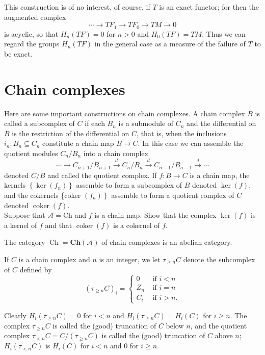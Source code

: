 This construction is of no interest, of course, if $T$ is an exact functor; for then the augmented complex
$$
\cdots \rightarrow T F_1 \rightarrow T F_0 \rightarrow T M \rightarrow 0
$$
is acyclic, so that $H_n(T F)=0$ for $n>0$ and $H_0(T F)=T M$. Thus we can regard the groups $H_n(T F)$ in the general case as a measure of the failure of $T$ to be exact.

\section{Chain complexes}

Here are some important constructions on chain complexes. A chain complex $B$ is called a subcomplex of $C$ if each $B_n$ is a submodule of $C_n$ and the differential on $B$ is the restriction of the differential on $C$, that is, when the inclusions $i_n: B_n \subseteq C_n$ constitute a chain map $B \rightarrow C$. In this case we can assemble the quotient modules $C_n / B_n$ into a chain complex
$$
\cdots \rightarrow C_{n+1} / B_{n+1} \xrightarrow{d} C_n / B_n \xrightarrow{d} C_{n-1} / B_{n-1} \xrightarrow{d} \cdots
$$
denoted $C / B$ and called the quotient complex. If $f: B \rightarrow C$ is a chain map, the kernels $\left\{\operatorname{ker}\left(f_n\right)\right\}$ assemble to form a subcomplex of $B$ denoted $\operatorname{ker}(f)$, and the cokernels \{coker $\left.\left(f_n\right)\right\}$ assemble to form a quotient complex of $C$ denoted $\operatorname{coker}(f)$.\\
Suppose that $\mathcal{A}=\mathrm{Ch}$ and $f$ is a chain map. Show that the complex $\operatorname{ker}(f)$ is a kernel of $f$ and that $\operatorname{coker}(f)$ is a cokernel of $f$.

\begin{theo}
The category $\operatorname{Ch}=\boldsymbol{C h}(\mathcal{A})$ of chain complexes is an abelian category.   
\end{theo}

If $C$ is a chain complex and $n$ is an integer, we let $\tau_{\geq n} C$ denote the subcomplex of $C$ defined by
$$
\left(\tau_{\geq n} C\right)_i= \begin{cases}0 & \text { if } i<n \\ Z_n & \text { if } i=n \\ C_i & \text { if } i>n .\end{cases}
$$

Clearly $H_i\left(\tau_{\geq n} C\right)=0$ for $i<n$ and $H_i\left(\tau_{\geq n} C\right)=H_i(C)$ for $i \geq n$. The complex $\tau_{\geq n} C$ is called the (good) truncation of $C$ below $n$, and the quotient complex $\tau_{<n} C=C /\left(\tau_{\geq n} C\right)$ is called the (good) truncation of $C$ above $n$; $H_i\left(\tau_{<n} C\right)$ is $H_i(C)$ for $i<n$ and 0 for $i \geq n$.\\

